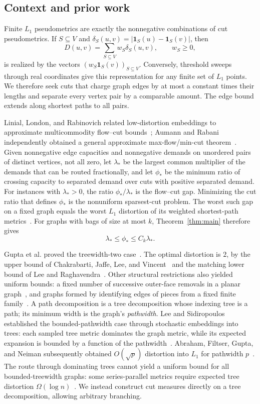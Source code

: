 \subsection{Context and prior work}

Finite $L_1$ pseudometrics are exactly the nonnegative combinations of cut
pseudometrics. If $S\subseteq V$ and
$\delta_S(u,v)=|\mathbf1_S(u)-\mathbf1_S(v)|$, then
\begin{equation}\label{eq:intro-cut-representation}
 D(u,v)=\sum_{S\subseteq V}w_S\delta_S(u,v),\qquad w_S\ge0,
\end{equation}
is realized by the vectors $(w_S\mathbf1_S(v))_{S\subseteq V}$.
Conversely, threshold sweeps through real coordinates give this
representation for any finite set of $L_1$ points. We therefore
seek cuts that charge graph edges by at most a constant times their
lengths and separate every vertex pair by a comparable amount.
The edge bound extends along shortest paths to all pairs.

Linial, London, and Rabinovich related low-distortion embeddings to
approximate multicommodity flow--cut bounds~\cite{LLR95}; Aumann and Rabani independently
obtained a general approximate max-flow/min-cut theorem~\cite{AR98}. Given nonnegative edge capacities and nonnegative demands on unordered pairs of distinct
vertices, not all zero, let $\lambda_*$ be the largest common multiplier of
the demands that can be routed fractionally, and let $\phi_*$ be the minimum
ratio of crossing capacity to separated demand over cuts with
positive separated demand. For instances with $\lambda_*>0$, the
ratio $\phi_*/\lambda_*$ is the flow--cut gap. Minimizing the cut
ratio that defines $\phi_*$ is the nonuniform sparsest-cut problem. The worst such gap
on a fixed graph equals the worst $L_1$ distortion of its weighted
shortest-path metrics~\cite[Section~3, Theorem~3.2]{GNRS}.
For graphs with bags of size at most $k$, Theorem~\ref{thm:main}
therefore gives
\[
 \lambda_*\leq\phi_*\leq C_k\lambda_*.
\]

Gupta et al. proved the treewidth-two case~\cite{GNRS}.
The optimal distortion is $2$, by the upper bound of Chakrabarti,
Jaffe, Lee, and Vincent~\cite{CJLV08} and the matching lower bound
of Lee and Raghavendra~\cite{LR10}. Other structural restrictions
also yielded uniform bounds: a fixed number of successive outer-face
removals in a planar graph~\cite{CGNRS06}, and graphs formed by
identifying edges of pieces from a fixed finite family~\cite{LP13}.
A path decomposition is a tree decomposition whose indexing tree is
a path; its minimum width is the graph's \emph{pathwidth}.
Lee and Sidiropoulos established the bounded-pathwidth case through
stochastic embeddings into trees: each sampled tree metric dominates
the graph metric, while its expected expansion is bounded by a function
of the pathwidth~\cite{LeeSidiropoulos}.
Abraham, Filtser, Gupta, and Neiman subsequently obtained
$O(\sqrt p)$ distortion into $L_1$ for pathwidth $p$~\cite{AFGN22}.
The route through dominating trees cannot yield a uniform bound for
all bounded-treewidth graphs: some series-parallel metrics require
expected tree distortion $\Omega(\log n)$~\cite[Theorem~5.6]{GNRS}.
We instead construct cut measures directly on a tree decomposition,
allowing arbitrary branching.

